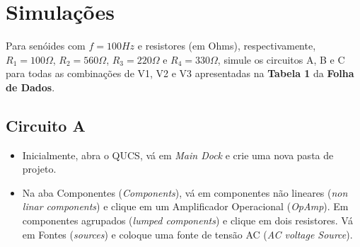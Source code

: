 \section{Simulações}
Para senóides com $f =100 Hz$ e resistores (em Ohms), respectivamente, $R_1 = 100\Omega$, $R_2 = 560\Omega$, $R_3 = 220\Omega$ e $R_4 = 330\Omega$, simule os circuitos A, B e C para todas as combinações de V1, V2 e V3 apresentadas na \textbf{Tabela 1} da \textbf{Folha de Dados}.

\subsection{Circuito A}


\begin{itemize}
    \item Inicialmente, abra o QUCS, vá em \textit{Main Dock} e crie uma nova pasta de projeto. 
    
    \item Na aba Componentes (\textit{Components}), vá em componentes não lineares (\textit{non linar components}) e clique em um Amplificador Operacional (\textit{OpAmp}). Em componentes agrupados (\textit{lumped components}) e clique em dois resistores. Vá em Fontes (\textit{sources}) e coloque uma fonte de tensão AC (\textit{AC voltage Source}).
\end{itemize}

